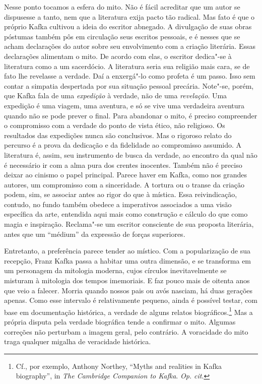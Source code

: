 Nesse ponto tocamos a esfera do mito. Não é fácil acreditar que um autor
se dispusesse a tanto, nem que a literatura exija pacto tão radical.
Mas fato é que o próprio Kafka cultivou a ideia do escritor abnegado. A
divulgação de suas obras póstumas também pôs em circulação seus
escritos pessoais, e é nesses que se acham declarações do autor sobre
seu envolvimento com a criação literária. Essas declarações alimentam o
mito. De acordo com elas, o escritor dedica"-se à literatura como a um
sacerdócio. A literatura seria sua religião mais cara, se de fato lhe
revelasse a verdade. Daí a enxergá"-lo como profeta é um passo. Isso
sem contar a simpatia despertada por sua situação pessoal precária.
Note"-se, porém, que Kafka fala de uma \textit{expedição} à verdade,
não de uma \textit{revelação}. Uma expedição é uma viagem, uma
aventura, e só se vive uma verdadeira aventura quando não se pode
prever o final. Para abandonar o mito, é preciso compreender o
compromisso com a verdade do ponto de vista ético, não religioso. Os
resultados das expedições nunca são conclusivos. Mas o rigoroso relato
do percurso é a prova da dedicação e da fidelidade ao compromisso
assumido. A literatura é, assim, seu instrumento de busca da verdade,
ao encontro da qual não é necessário ir com a alma pura dos crentes
inocentes. Também não é preciso deixar ao cinismo o papel principal.
Parece haver em Kafka, como nos grandes autores, um compromisso com a
sinceridade. A tortura ou o transe da criação podem, sim, se associar antes ao
rigor do que à mística. Essa reivindicação, contudo, no fundo também
obedece a imperativos associados a uma visão específica da arte,
entendida aqui mais como construção e cálculo do que como magia e
inspiração. Reclama"-se um escritor consciente de sua proposta
literária, antes que um “médium” da expressão de forças superiores.

Entretanto, a preferência parece tender ao místico. 
Com a popularização de sua recepção, Franz Kafka
passa a habitar uma outra dimensão, e se transforma em um personagem da
mitologia moderna, cujos círculos inevitavelmente se misturam à
mitologia dos tempos imemoriais. E faz pouco mais de oitenta anos que
veio a falecer. Morria quando nossos pais ou avós nasciam, há duas
gerações apenas. Como esse intervalo é relativamente pequeno, ainda é
possível testar, com base em documentação histórica, a verdade de
alguns relatos biográficos.\footnote{ Cf., por exemplo, Anthony
Northey, “Myths and realities in Kafka biography”, in \textit{The
Cambridge Companion to Kafka}. \textit{Op. cit}.} Mas a própria disputa pela verdade biográfica tende a confirmar
o mito. Algumas correções não perturbam a imagem geral, pelo contrário.
A voracidade do mito traga qualquer migalha de veracidade histórica.

